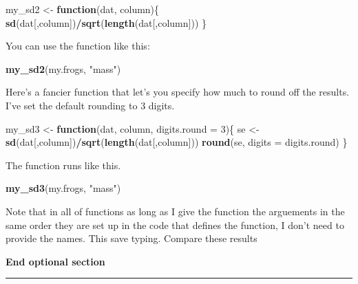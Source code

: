 \documentclass[]{book}
\newenvironment{Shaded}{\begin{snugshade}}{\end{snugshade}}
\newcommand{\KeywordTok}[1]{\textcolor[rgb]{0.13,0.29,0.53}{\textbf{#1}}}
\newcommand{\DataTypeTok}[1]{\textcolor[rgb]{0.13,0.29,0.53}{#1}}
\newcommand{\DecValTok}[1]{\textcolor[rgb]{0.00,0.00,0.81}{#1}}
\newcommand{\StringTok}[1]{\textcolor[rgb]{0.31,0.60,0.02}{#1}}
\newcommand{\ControlFlowTok}[1]{\textcolor[rgb]{0.13,0.29,0.53}{\textbf{#1}}}
\newcommand{\OperatorTok}[1]{\textcolor[rgb]{0.81,0.36,0.00}{\textbf{#1}}}
\newcommand{\NormalTok}[1]{#1}
\theoremstyle{definition}
\theoremstyle{definition}
\theoremstyle{definition}
\theoremstyle{remark}
\begin{document}
\begin{Shaded}
\begin{Highlighting}[]
\NormalTok{my_sd2 <-}\StringTok{ }\ControlFlowTok{function}\NormalTok{(dat, column)\{}
  \KeywordTok{sd}\NormalTok{(dat[,column])}\OperatorTok{/}\KeywordTok{sqrt}\NormalTok{(}\KeywordTok{length}\NormalTok{(dat[,column]))}
\NormalTok{\}}
\end{Highlighting}
\end{Shaded}

You can use the function like this:

\begin{Shaded}
\begin{Highlighting}[]
\KeywordTok{my_sd2}\NormalTok{(my.frogs, }\StringTok{"mass"}\NormalTok{)}
\end{Highlighting}
\end{Shaded}

Here's a fancier function that let's you specify how much to round off
the results. I've set the default rounding to 3 digits.

\begin{Shaded}
\begin{Highlighting}[]
\NormalTok{my_sd3 <-}\StringTok{ }\ControlFlowTok{function}\NormalTok{(dat, column, }\DataTypeTok{digits.round =} \DecValTok{3}\NormalTok{)\{}
\NormalTok{  se <-}\StringTok{ }\KeywordTok{sd}\NormalTok{(dat[,column])}\OperatorTok{/}\KeywordTok{sqrt}\NormalTok{(}\KeywordTok{length}\NormalTok{(dat[,column]))}
  \KeywordTok{round}\NormalTok{(se, }\DataTypeTok{digits =}\NormalTok{ digits.round)}
\NormalTok{\}}
\end{Highlighting}
\end{Shaded}

The function runs like this.

\begin{Shaded}
\begin{Highlighting}[]
\KeywordTok{my_sd3}\NormalTok{(my.frogs, }\StringTok{"mass"}\NormalTok{)}
\end{Highlighting}
\end{Shaded}

Note that in all of functions as long as I give the function the
arguements in the same order they are set up in the code that defines
the function, I don't need to provide the names. This save typing.
Compare these results

\textbf{End optional section}

\begin{center}\rule{0.5\linewidth}{\linethickness}\end{center}
\end{document}
